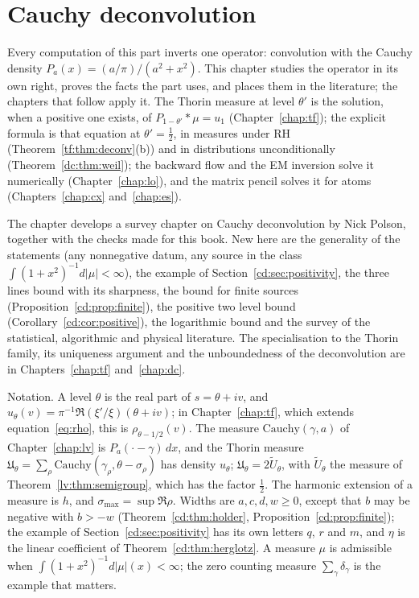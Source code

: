 \chapter{Cauchy deconvolution}\label{chap:cd}

Every computation of this part inverts one operator: convolution with the Cauchy density $P_a(x)=(a/\pi)/(a^2+x^2)$. This chapter studies the operator in its own right, proves the facts the part uses, and places them in the literature; the chapters that follow apply it. The Thorin measure at level $\theta'$ is the solution, when a positive one exists, of $P_{1-\theta'}*\mu=u_1$ (Chapter~\ref{chap:tf}); the explicit formula is that equation at $\theta'=\tfrac12$, in measures under RH (Theorem~\ref{tf:thm:deconv}(b)) and in distributions unconditionally (Theorem~\ref{dc:thm:weil}); the backward flow and the EM inversion solve it numerically (Chapter~\ref{chap:lo}), and the matrix pencil solves it for atoms (Chapters~\ref{chap:cx} and~\ref{chap:es}).

The chapter develops a survey chapter on Cauchy deconvolution by Nick Polson, together with the checks made for this book. New here are the generality of the statements (any nonnegative datum, any source in the class $\int(1+x^2)^{-1}d\lvert\mu\rvert<\infty$), the example of Section~\ref{cd:sec:positivity}, the three lines bound with its sharpness, the bound for finite sources (Proposition~\ref{cd:prop:finite}), the positive two level bound (Corollary~\ref{cd:cor:positive}), the logarithmic bound and the survey of the statistical, algorithmic and physical literature. The specialisation to the Thorin family, its uniqueness argument and the unboundedness of the deconvolution are in Chapters~\ref{chap:tf} and~\ref{chap:dc}.

Notation. A level $\theta$ is the real part of $s=\theta+iv$, and $u_\theta(v)=\pi^{-1}\Re(\xi'/\xi)(\theta+iv)$; in Chapter~\ref{chap:tf}, which extends equation~\eqref{eq:rho}, this is $\rho_{\theta-1/2}(v)$. The measure $\mathrm{Cauchy}(\gamma,a)$ of Chapter~\ref{chap:lv} is $P_a(\cdot-\gamma)\,dx$, and the Thorin measure $\mathfrak U_\theta=\sum_\rho\mathrm{Cauchy}(\gamma_\rho,\theta-\sigma_\rho)$ has density $u_\theta$; $\mathfrak U_\theta=2\widetilde U_\theta$, with $\widetilde U_\theta$ the measure of Theorem~\ref{lv:thm:semigroup}, which has the factor $\tfrac12$. The harmonic extension of a measure is $h$, and $\sigma_{\max}=\sup\Re\rho$. Widths are $a,c,d,w\ge0$, except that $b$ may be negative with $b>-w$ (Theorem~\ref{cd:thm:holder}, Proposition~\ref{cd:prop:finite}); the example of Section~\ref{cd:sec:positivity} has its own letters $q$, $r$ and $m$, and $\eta$ is the linear coefficient of Theorem~\ref{cd:thm:herglotz}. A measure $\mu$ is admissible when $\int(1+x^2)^{-1}d\lvert\mu\rvert(x)<\infty$; the zero counting measure $\sum_\gamma\delta_\gamma$ is the example that matters.

